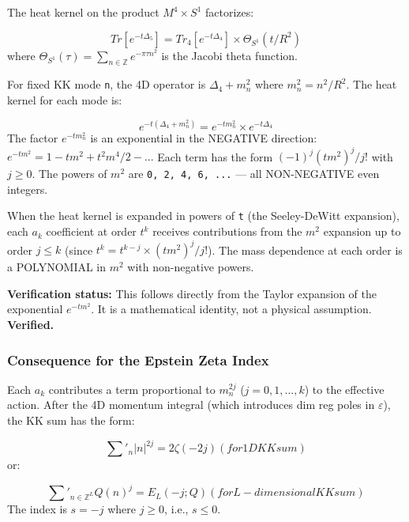 \documentclass[aps,prd,preprint,superscriptaddress,longbibliography,floatfix]{revtex4-2}
\theoremstyle{remark}
\begin{document}
The heat kernel on the product $M^{4} \times S^{1}$ factorizes:


\begin{equation}
    Tr[e^{-t\Delta_{5}}] = Tr_{4}[e^{-t\Delta_{4}}] \times \Theta_{S^{1}}(t/R^{2})
\end{equation}
where $\Theta_{S^{1}}(\tau) = \sum_{n \in \mathbb{Z}} e^{-\pi\tau n^{2}}$ is the Jacobi theta function.

For fixed KK mode \texttt{n}, the 4D operator is $\Delta_{4} + m_n^{2}$ where $m_n^{2} = n^{2}/R^{2}$. The heat kernel for each mode is:


\begin{equation}
    e^{-t(\Delta_{4} + m_n^{2})} = e^{-tm_n^{2}} \times e^{-t\Delta_{4}}
\end{equation}
The factor $e^{-tm_n^{2}}$ is an exponential in the NEGATIVE direction: $e^{-tm^{2}} = 1 - tm^{2} + t^{2}m^{4}/2 - ...$ Each term has the form $(-1)^j (tm^{2})^j/j!$ with $j \geq 0$. The powers of $m^{2}$ are \texttt{{0, 2, 4, 6, ...}} --- all NON-NEGATIVE even integers.

When the heat kernel is expanded in powers of \texttt{t} (the Seeley-DeWitt expansion), each $a_k$ coefficient at order $t^k$ receives contributions from the $m^{2}$ expansion up to order $j \leq k$ (since $t^k = t^{k-j} \times (tm^{2})^j/j!$). The mass dependence at each order is a POLYNOMIAL in $m^{2}$ with non-negative powers.

\textbf{Verification status:} This follows directly from the Taylor expansion of the exponential $e^{-tm^{2}}$. It is a mathematical identity, not a physical assumption. \textbf{Verified.}


\subsubsection{Consequence for the Epstein Zeta Index}

Each $a_k$ contributes a term proportional to $m_n^{2j}$ ($j = 0, 1, ..., k$) to the effective action. After the 4D momentum integral (which introduces dim reg poles in $\varepsilon$), the KK sum has the form:


\begin{equation}
    \sum'_n |n|^{2j} = 2\zeta(-2j)  (for 1D KK sum)
\end{equation}
or:


\begin{equation}
    \sum'_{n \in \mathbb{Z}^L} Q(n)^j = E_L(-j; Q)  (for L-dimensional KK sum)
\end{equation}
The index is $s = -j$ where $j \geq 0$, i.e., \textbf{$s \leq 0$}.
\end{document}
